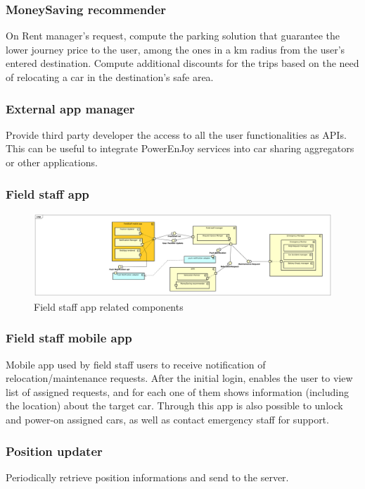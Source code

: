 \documentclass[english]{article}
\begin{document}
		\subsubsection{MoneySaving recommender }
		On Rent manager's request, compute the parking solution that guarantee the lower journey price to the user, among the ones in a km radius from the user's entered destination. Compute additional discounts for the trips based on the need of relocating a car in the destination's safe area.
		
	\subsubsection{External app manager}
	Provide third party developer the access to all the user functionalities as APIs. This can be useful to integrate PowerEnJoy services into car sharing aggregators or other applications.
	
	
\subsubsection*{Field staff app}

	\begin{figure}[H]
		\centering
		\includegraphics[scale=0.21]{./ComponentDiagrams/FieldStaff.pdf}%
		\caption{Field staff app related components}
	\end{figure}
	
	\subsubsection{Field staff mobile app}
	Mobile app used by field staff users to receive notification of relocation/maintenance requests. After the initial login, enables the user to view list of assigned requests, and for each one of them shows information (including the location) about the target car. Through this app is also possible to unlock and power-on assigned cars, as well as contact emergency staff for support.
		\subsubsection{Position updater}
		Periodically retrieve position informations and send to the server.
\end{document}
